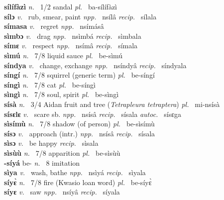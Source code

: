 {\bfseries sílífàzì}  {\itshape n.~} 1/2 sandal {\itshape pl.~} ba-sílífàzì    \\ 
{\bfseries sílɔ}  {\itshape v.~} rub, smear, paint   {\itshape npp.~} nsílâ {\itshape recip.~} sílala  \\ 
{\bfseries símasa}  {\itshape v.~} regret   {\itshape npp.~} nsímásâ  \\ 
{\bfseries sìmbɔ}  {\itshape v.~} drag   {\itshape npp.~} nsìmbá {\itshape recip.~} sìmbala  \\ 
{\bfseries símɛ}  {\itshape v.~} respect   {\itshape npp.~} nsímâ {\itshape recip.~} símala  \\ 
{\bfseries sìmú}  {\itshape n.~} 7/8 liquid sauce {\itshape pl.~} be-sìmú    \\ 
{\bfseries síndya}  {\itshape v.~} change, exchange   {\itshape npp.~} nsíndyâ {\itshape recip.~} síndyala  \\ 
{\bfseries síngí}  {\itshape n.~} 7/8 squirrel (generic term) {\itshape pl.~} be-síngí    \\ 
{\bfseries síngì}  {\itshape n.~} 7/8 cat {\itshape pl.~} be-síngì    \\ 
{\bfseries sìngì}  {\itshape n.~} 7/8 soul, spirit {\itshape pl.~} be-sìngì    \\ 
{\bfseries sísà}  {\itshape n.~} 3/4 Aidan fruit and tree ({\itshape Tetrapleura tetraptera}) {\itshape pl.~} mi-nsísà    \\ 
{\bfseries sísɛlɛ}  {\itshape v.~} scare sb.  {\itshape npp.~} nsísâ  {\itshape recip.~} sísala {\itshape autoc.~} sísɛga  \\ 
{\bfseries sìsímù}  {\itshape n.~} 7/8 shadow (of  person) {\itshape pl.~} be-sìsímù    \\ 
{\bfseries sísɔ}  {\itshape v.~} approach (intr.)   {\itshape npp.~} nsísâ {\itshape recip.~} sísala  \\ 
{\bfseries sìsɔ}  {\itshape v.~} be happy   {\itshape recip.~} sìsala  \\ 
{\bfseries sìsùù}  {\itshape n.~} 7/8 apparition {\itshape pl.~} be-sìsùù    \\ 
{\bfseries -síyá} be- {\itshape n.~} 8 imitation    \\ 
{\bfseries sìya}  {\itshape v.~} wash, bathe   {\itshape npp.~} nsìyá {\itshape recip.~} sìyala  \\ 
{\bfseries síyɛ̀}  {\itshape n.~} 7/8 fire (Kwasio loan word) {\itshape pl.~} be-síyɛ̀    \\ 
{\bfseries síyɛ}  {\itshape v.~} saw   {\itshape npp.~} nsíyâ {\itshape recip.~} síyala  \\ 
